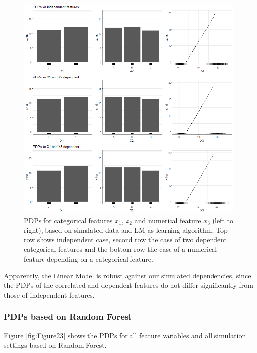 \documentclass[]{krantz}
\begin{document}
\begin{figure}

\includegraphics[width=1\linewidth]{images/VK_PDP_22_Set4_LM} \hfill{}

\caption{PDPs for categorical features $x_1$, $x_2$ and numerical feature $x_3$ (left to right), based on simulated data and LM as learning algorithm. Top row shows independent case, second row the case of two dependent categorical features and the bottom row the case of a numerical feature depending on a categorical feature.}\label{fig:Figure22}
\end{figure}

Apparently, the Linear Model is robust against our simulated
dependencies, since the PDPs of the correlated and dependent features do
not differ significantly from those of independent features.

\subsubsection{PDPs based on Random
Forest}\label{pdps-based-on-random-forest-3}

Figure \ref{fig:Figure23} shows the PDPs for all feature variables and
all simulation settings based on Random Forest.
\end{document}
